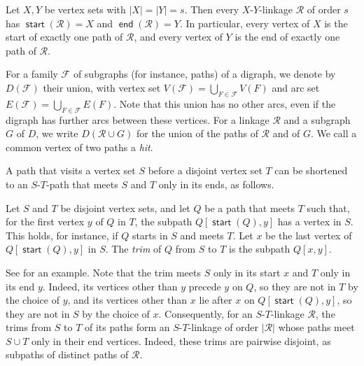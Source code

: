 \documentclass[fontsize=12pt,leading=14pt]{fullpaper}
\DeclareMathOperator{\st}{\mathsf{start}}
\DeclareMathOperator{\en}{\mathsf{end}}
\newcommand{\Fcal}{\mathcal{F}}
\newcommand{\Rcal}{\mathcal{R}}
\begin{document}
\begin{observation}\label{obs:full-linkage}
  Let $X,Y$ be vertex sets with $|X|=|Y|=s$.
  Then every $X$-$Y$-linkage $\Rcal$ of order $s$ has $\st(\Rcal)=X$ and $\en(\Rcal)=Y$.
  In particular, every vertex of $X$ is the start of exactly one path of $\Rcal$, and every vertex of $Y$ is the end of exactly one path of $\Rcal$.
\end{observation}

For a family $\Fcal$ of subgraphs (for instance, paths) of a digraph, we denote by $D(\Fcal)$ their union, with vertex set $V(\Fcal)=\bigcup_{F\in\Fcal}V(F)$ and arc set $E(\Fcal)=\bigcup_{F\in\Fcal}E(F)$.
Note that this union has no other arcs, even if the digraph has further arcs between these vertices.
For a linkage $\Rcal$ and a subgraph $G$ of $D$, we write $D(\Rcal\cup G)$ for the union of the paths of $\Rcal$ and of $G$.
We call a common vertex of two paths a \emph{hit}.

A path that visits a vertex set $S$ before a disjoint vertex set $T$ can be shortened to an $S$-$T$-path that meets $S$ and $T$ only in its ends, as follows.

\begin{definition}[Trim]\label{def:trim}
  Let $S$ and $T$ be disjoint vertex sets, and let $Q$ be a path that meets $T$ such that, for the first vertex $y$ of $Q$ in $T$, the subpath $Q[\st(Q),y]$ has a vertex in $S$.
  This holds, for instance, if $Q$ starts in $S$ and meets $T$.
  Let $x$ be the last vertex of $Q[\st(Q),y]$ in $S$.
  The \emph{trim} of $Q$ from $S$ to $T$ is the subpath $Q[x,y]$.
\end{definition}

See  for an example.
Note that the trim meets $S$ only in its start $x$ and $T$ only in its end $y$.
Indeed, its vertices other than $y$ precede $y$ on $Q$, so they are not in $T$ by the choice of $y$, and its vertices other than $x$ lie after $x$ on $Q[\st(Q),y]$, so they are not in $S$ by the choice of $x$.
Consequently, for an $S$-$T$-linkage $\Rcal$, the trims from $S$ to $T$ of its paths form an $S$-$T$-linkage of order $|\Rcal|$ whose paths meet $S\cup T$ only in their end vertices.
Indeed, these trims are pairwise disjoint, as subpaths of distinct paths of $\Rcal$.
\end{document}
